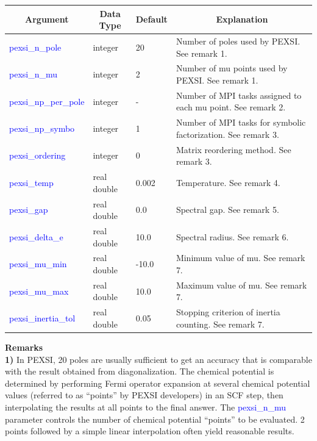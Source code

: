 \documentclass{report}
\begin{document}
\begin{tabular}[]{|p{30mm}|p{20mm}|p{15mm}|p{100mm}|}
\hline
\multicolumn{1}{|c|}{\textbf{Argument}} & \multicolumn{1}{c|}{\textbf{Data Type}} & \multicolumn{1}{c|}{\textbf{Default}} & \multicolumn{1}{c|}{\textbf{Explanation}}\\
\hline
\textcolor{blue}{pexsi\_n\_pole}          & integer     & 20    & Number of poles used by PEXSI.  See remark 1.\\
\hline
\textcolor{blue}{pexsi\_n\_mu}            & integer     & 2     & Number of mu points used by PEXSI.  See remark 1.\\
\hline
\textcolor{blue}{pexsi\_np\_per\_pole}    & integer     & -     & Number of MPI tasks assigned to each mu point.  See remark 2.\\
\hline
\textcolor{blue}{pexsi\_np\_symbo}        & integer     & 1     & Number of MPI tasks for symbolic factorization.  See remark 3.\\
\hline
\textcolor{blue}{pexsi\_ordering}         & integer     & 0     & Matrix reordering method.  See remark 3.\\
\hline
\textcolor{blue}{pexsi\_temp}             & real double & 0.002 & Temperature.  See remark 4.\\
\hline
\textcolor{blue}{pexsi\_gap}              & real double & 0.0   & Spectral gap.  See remark 5.\\
\hline
\textcolor{blue}{pexsi\_delta\_e}         & real double & 10.0  & Spectral radius.  See remark 6.\\
\hline
\textcolor{blue}{pexsi\_mu\_min}          & real double & -10.0 & Minimum value of mu.  See remark 7.\\
\hline
\textcolor{blue}{pexsi\_mu\_max}          & real double & 10.0  & Maximum value of mu.  See remark 7.\\
\hline
\textcolor{blue}{pexsi\_inertia\_tol}     & real double & 0.05  & Stopping criterion of inertia counting.  See remark 7.\\
\hline
\end{tabular}

\bigskip
\textbf{Remarks}\\

\textbf{1)} In PEXSI, 20 poles are usually sufficient to get an accuracy that is comparable with the result obtained from diagonalization.  The chemical potential is determined by performing Fermi operator expansion at several chemical potential values (referred to as ``points'' by PEXSI developers) in an SCF step, then interpolating the results at all points to the final answer.  The \textcolor{blue}{pexsi\_n\_mu} parameter controls the number of chemical potential ``points'' to be evaluated.  2 points followed by a simple linear interpolation often yield reasonable results.\\
\end{document}
